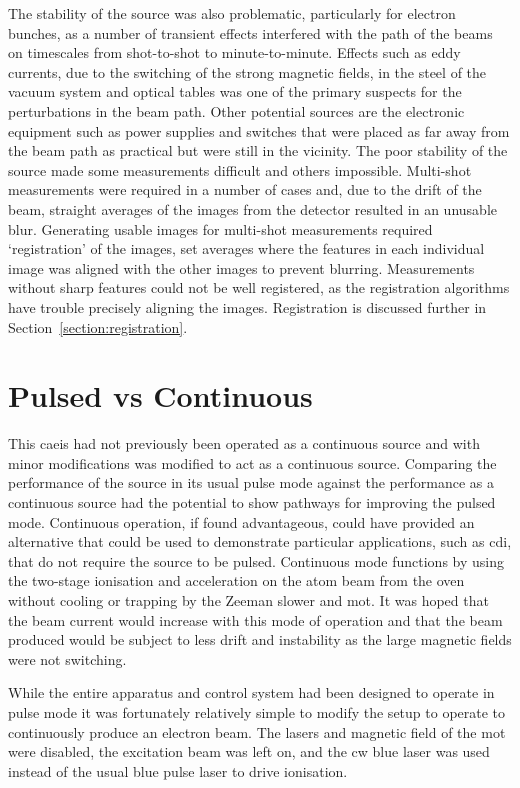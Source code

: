 The stability of the source was also problematic, particularly for electron bunches, as a number of transient effects interfered with the path of the beams on timescales from shot-to-shot to minute-to-minute.
Effects such as eddy currents, due to the switching of the strong magnetic fields, in the steel of the vacuum system and optical tables was one of the primary suspects for the perturbations in the beam path.
Other potential sources are the electronic equipment such as power supplies and switches that were placed as far away from the beam path as practical but were still in the vicinity.
The poor stability of the source made some measurements difficult and others impossible.
Multi-shot measurements were required in a number of cases and, due to the drift of the beam, straight averages of the images from the detector resulted in an unusable blur.
Generating usable images for multi-shot measurements required `registration' of the images, set averages where the features in each individual image was aligned with the other images to prevent blurring.
Measurements without sharp features could not be well registered, as the registration algorithms have trouble precisely aligning the images.
Registration is discussed further in Section~\ref{section:registration}.

\section{Pulsed vs Continuous}\label{section:pulse_vs_continuous}
This \gls{caeis} had not previously been operated as a continuous source and with minor modifications was modified to act as a continuous source.
Comparing the performance of the source in its usual pulse mode against the performance as a continuous source had the potential to show pathways for improving the pulsed mode.
Continuous operation, if found advantageous, could have provided an alternative that could be used to demonstrate particular applications, such as \gls{cdi}, that do not require the source to be pulsed.
Continuous mode functions by using the two-stage ionisation and acceleration on the atom beam from the oven without cooling or trapping by the Zeeman slower and \gls{mot}.
It was hoped that the beam current would increase with this mode of operation and that the beam produced would be subject to less drift and instability as the large magnetic fields were not switching.

While the entire apparatus and control system had been designed to operate in pulse mode it was fortunately relatively simple to modify the setup to operate to continuously produce an electron beam.
The lasers and magnetic field of the \gls{mot} were disabled, the excitation beam was left on, and the \gls{cw} blue laser was used instead of the usual blue pulse laser to drive ionisation.

